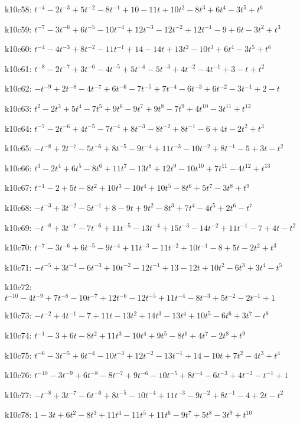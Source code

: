 k10c58: $t^{-4}-2t^{-3}+5t^{-2}-8t^{-1}+10-11t+10t^{2}-8t^{3}+6t^{4}-3t^{5}+t^{6}$

k10c59: $t^{-7}-3t^{-6}+6t^{-5}-10t^{-4}+12t^{-3}-12t^{-2}+12t^{-1}-9+6t-3t^{2}+t^{3}$

k10c60: $t^{-4}-4t^{-3}+8t^{-2}-11t^{-1}+14-14t+13t^{2}-10t^{3}+6t^{4}-3t^{5}+t^{6}$

k10c61: $t^{-8}-2t^{-7}+3t^{-6}-4t^{-5}+5t^{-4}-5t^{-3}+4t^{-2}-4t^{-1}+3-t+t^{2}$

k10c62: $-t^{-9}+2t^{-8}-4t^{-7}+6t^{-6}-7t^{-5}+7t^{-4}-6t^{-3}+6t^{-2}-3t^{-1}+2-t$

k10c63: $t^{2}-2t^{3}+5t^{4}-7t^{5}+9t^{6}-9t^{7}+9t^{8}-7t^{9}+4t^{10}-3t^{11}+t^{12}$

k10c64: $t^{-7}-2t^{-6}+4t^{-5}-7t^{-4}+8t^{-3}-8t^{-2}+8t^{-1}-6+4t-2t^{2}+t^{3}$

k10c65: $-t^{-8}+2t^{-7}-5t^{-6}+8t^{-5}-9t^{-4}+11t^{-3}-10t^{-2}+8t^{-1}-5+3t-t^{2}$

k10c66: $t^{3}-2t^{4}+6t^{5}-8t^{6}+11t^{7}-13t^{8}+12t^{9}-10t^{10}+7t^{11}-4t^{12}+t^{13}$

k10c67: $t^{-1}-2+5t-8t^{2}+10t^{3}-10t^{4}+10t^{5}-8t^{6}+5t^{7}-3t^{8}+t^{9}$

k10c68: $-t^{-3}+3t^{-2}-5t^{-1}+8-9t+9t^{2}-8t^{3}+7t^{4}-4t^{5}+2t^{6}-t^{7}$

k10c69: $-t^{-8}+3t^{-7}-7t^{-6}+11t^{-5}-13t^{-4}+15t^{-3}-14t^{-2}+11t^{-1}-7+4t-t^{2}$

k10c70: $t^{-7}-3t^{-6}+6t^{-5}-9t^{-4}+11t^{-3}-11t^{-2}+10t^{-1}-8+5t-2t^{2}+t^{3}$

k10c71: $-t^{-5}+3t^{-4}-6t^{-3}+10t^{-2}-12t^{-1}+13-12t+10t^{2}-6t^{3}+3t^{4}-t^{5}$

k10c72: $t^{-10}-4t^{-9}+7t^{-8}-10t^{-7}+12t^{-6}-12t^{-5}+11t^{-4}-8t^{-3}+5t^{-2}-2t^{-1}+1$

k10c73: $-t^{-2}+4t^{-1}-7+11t-13t^{2}+14t^{3}-13t^{4}+10t^{5}-6t^{6}+3t^{7}-t^{8}$

k10c74: $t^{-1}-3+6t-8t^{2}+11t^{3}-10t^{4}+9t^{5}-8t^{6}+4t^{7}-2t^{8}+t^{9}$

k10c75: $t^{-6}-3t^{-5}+6t^{-4}-10t^{-3}+12t^{-2}-13t^{-1}+14-10t+7t^{2}-4t^{3}+t^{4}$

k10c76: $t^{-10}-3t^{-9}+6t^{-8}-8t^{-7}+9t^{-6}-10t^{-5}+8t^{-4}-6t^{-3}+4t^{-2}-t^{-1}+1$

k10c77: $-t^{-8}+3t^{-7}-6t^{-6}+8t^{-5}-10t^{-4}+11t^{-3}-9t^{-2}+8t^{-1}-4+2t-t^{2}$

k10c78: $1-3t+6t^{2}-8t^{3}+11t^{4}-11t^{5}+11t^{6}-9t^{7}+5t^{8}-3t^{9}+t^{10}$

